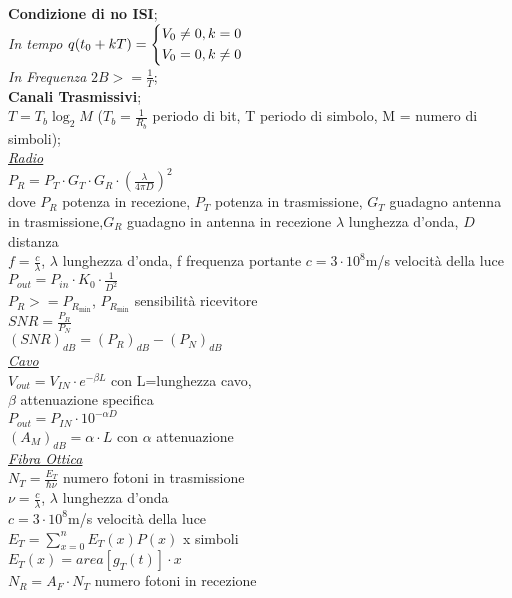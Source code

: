 \documentclass[a4paper]{article}
\begin{document}
\begin{multicols*}{2}
\textbf{Condizione di no ISI}; \\
\textit{In tempo}
 $ q(t_{0}+kT)=
\begin{dcases}
    V_0\ne0 , k=0  \\
    V_0=0, k\ne0  \\
\end{dcases}
$ \\
\textit{In Frequenza}
$2B >= \frac{1}{T}$; \\
\textbf{Canali Trasmissivi}; \\
$T=T_b \log_{2}{M}$ ($T_b = \frac{1}{R_b}$ periodo di bit, T periodo di simbolo,
M = numero di simboli);\\
\underline{\textit{Radio}} \\
$P_R = P_T \cdot G_T \cdot G_R \cdot {(\frac{\lambda}{4\pi D})}^{2}$\\
dove $P_R$ potenza in recezione, $P_T$ potenza in trasmissione,
$G_T$ guadagno antenna in trasmissione,$G_R$ guadagno in antenna in recezione
$\lambda$ lunghezza d'onda, $D$ distanza\\
$f = \frac{c}{\lambda}$, $\lambda$ lunghezza d'onda, f frequenza portante
$c=3\cdot10^8$m/s  velocità della luce \\
$P_{out}=P_{in}\cdot K_0\cdot\frac{1}{D^2}$\\
$P_R >= P_{R_{\min}}$, $P_{R_{\min}}$ sensibilità ricevitore \\
$SNR=\frac{P_R}{P_N}$ \\
${(SNR)}_{dB}={(P_R)}_{dB}-{(P_N)}_{dB}$ \\
\underline{\textit{Cavo}} \\
$V_{out}=V_{IN}\cdot e^{-\beta L}$ con L=lunghezza cavo, \\
$\beta$ attenuazione specifica\\
$P_{out}=P_{IN}\cdot 10^{-\alpha D}$ \\
${(A_M)}_{dB}=\alpha\cdot L$ con $\alpha$ attenuazione\\
\underline{\textit{Fibra Ottica}} \\
$N_T = \frac{E_T}{\hbar\nu}$ numero fotoni in trasmissione \\
$\nu = \frac{c}{\lambda}$, $\lambda$ lunghezza d'onda \\
$c=3\cdot10^8$m/s  velocità della luce \\
$E_T = \sum_{x=0}^{n}{E_T(x)P(x)}$ x simboli \\
$E_T(x) = area[g_T(t)]\cdot x$ \\
$N_R = A_F\cdot N_T$ numero fotoni in recezione

\end{multicols*}
\end{document}
